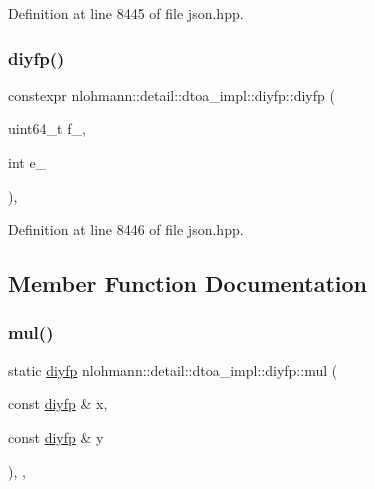 Definition at line 8445 of file json.\+hpp.

\mbox{\label{structnlohmann_1_1detail_1_1dtoa__impl_1_1diyfp_a332ba792e67dd40cd99a23f6dceb7792}} 
\subsubsection{\texorpdfstring{diyfp()}{diyfp()}\hspace{0.1cm}{\footnotesize\ttfamily [2/2]}}
{\footnotesize\ttfamily constexpr nlohmann\+::detail\+::dtoa\+\_\+impl\+::diyfp\+::diyfp (\begin{DoxyParamCaption}\item[{uint64\+\_\+t}]{f\+\_\+,  }\item[{int}]{e\+\_\+ }\end{DoxyParamCaption})\hspace{0.3cm}{\ttfamily [inline]}, {\ttfamily [noexcept]}}



Definition at line 8446 of file json.\+hpp.



\subsection{Member Function Documentation}
\mbox{\label{structnlohmann_1_1detail_1_1dtoa__impl_1_1diyfp_aa5f250d12ce89c81fdb08900c6a823e8}} 
\subsubsection{\texorpdfstring{mul()}{mul()}}
{\footnotesize\ttfamily static \hyperlink{structnlohmann_1_1detail_1_1dtoa__impl_1_1diyfp}{diyfp} nlohmann\+::detail\+::dtoa\+\_\+impl\+::diyfp\+::mul (\begin{DoxyParamCaption}\item[{const \hyperlink{structnlohmann_1_1detail_1_1dtoa__impl_1_1diyfp}{diyfp} \&}]{x,  }\item[{const \hyperlink{structnlohmann_1_1detail_1_1dtoa__impl_1_1diyfp}{diyfp} \&}]{y }\end{DoxyParamCaption})\hspace{0.3cm}{\ttfamily [inline]}, {\ttfamily [static]}, {\ttfamily [noexcept]}}



